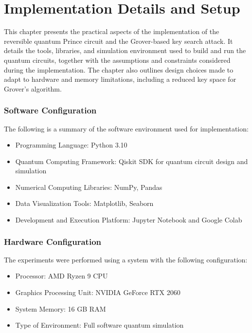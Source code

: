 \documentclass[12pt,a4paper]{report}
\begin{document}
\cleardoublepage
\onehalfspacing


\cleardoublepage
\onehalfspacing







\chapter{Implementation Details and Setup}

This chapter presents the practical aspects of the implementation of the reversible quantum Prince circuit and the Grover-based key search attack. It details the tools, libraries, and simulation environment used to build and run the quantum circuits, together with the assumptions and constraints considered during the implementation. The chapter also outlines design choices made to adapt to hardware and memory limitations, including a reduced key space for Grover's algorithm.

\subsection{Software Configuration}

The following is a summary of the software environment used for implementation:
\begin{itemize}
\item Programming Language: Python 3.10
\item Quantum Computing Framework: Qiskit SDK for quantum circuit design and simulation
\item Numerical Computing Libraries: NumPy, Pandas
\item Data Visualization Tools: Matplotlib, Seaborn
\item Development and Execution Platform: Jupyter Notebook and Google Colab
\end{itemize}

\subsection{Hardware Configuration}

The experiments were performed using a system with the following configuration:
\begin{itemize}
\item Processor: AMD Ryzen 9 CPU
\item Graphics Processing Unit: NVIDIA GeForce RTX 2060
\item System Memory: 16 GB RAM
\item Type of Environment: Full software quantum simulation
\end{itemize}
\end{document}
